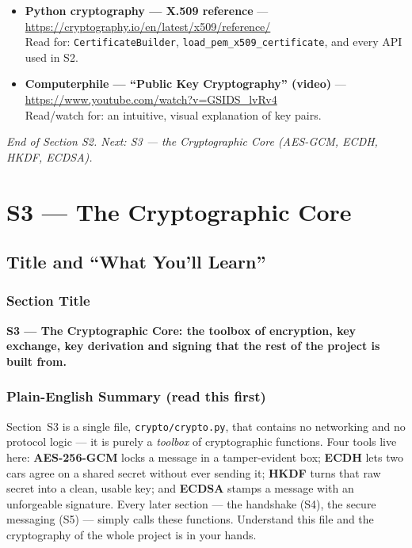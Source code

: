 \documentclass[11pt,a4paper]{report}
\begin{document}
\begin{itemize}
        \url{https://cryptography.io/en/latest/x509/}\\
        Read for: how this project's exact library handles certificates and PEM.
  \item \textbf{Python cryptography --- X.509 reference} ---
        \url{https://cryptography.io/en/latest/x509/reference/}\\
        Read for: \texttt{CertificateBuilder}, \texttt{load\_pem\_x509\_certificate},
        and every API used in S2.
  \item \textbf{Computerphile --- ``Public Key Cryptography'' (video)} ---
        \url{https://www.youtube.com/watch?v=GSIDS_lvRv4}\\
        Read/watch for: an intuitive, visual explanation of key pairs.
\end{itemize}

\vfill
\begin{center}\footnotesize\itshape
End of Section S2. Next: S3 --- the Cryptographic Core (AES-GCM, ECDH, HKDF, ECDSA).
\end{center}



\chapter{S3 --- The Cryptographic Core}

\section{Title and ``What You'll Learn''}

\subsection*{Section Title}
\textbf{S3 --- The Cryptographic Core: the toolbox of encryption, key exchange,
key derivation and signing that the rest of the project is built from.}

\subsection*{Plain-English Summary (read this first)}
Section~S3 is a single file, \texttt{crypto/crypto.py}, that contains no
networking and no protocol logic --- it is purely a \emph{toolbox} of
cryptographic functions. Four tools live here: \textbf{AES-256-GCM} locks a
message in a tamper-evident box; \textbf{ECDH} lets two cars agree on a shared
secret without ever sending it; \textbf{HKDF} turns that raw secret into a clean,
usable key; and \textbf{ECDSA} stamps a message with an unforgeable signature.
Every later section --- the handshake (S4), the secure messaging (S5) --- simply
calls these functions. Understand this file and the cryptography of the whole
project is in your hands.
\end{document}
